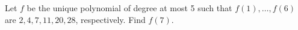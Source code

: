 Let $f$ be the unique polynomial of degree at most 5 such that $f(1),\ldots,f(6)$ are $2,4,7,11,20,28$, respectively. Find $f(7)$.
